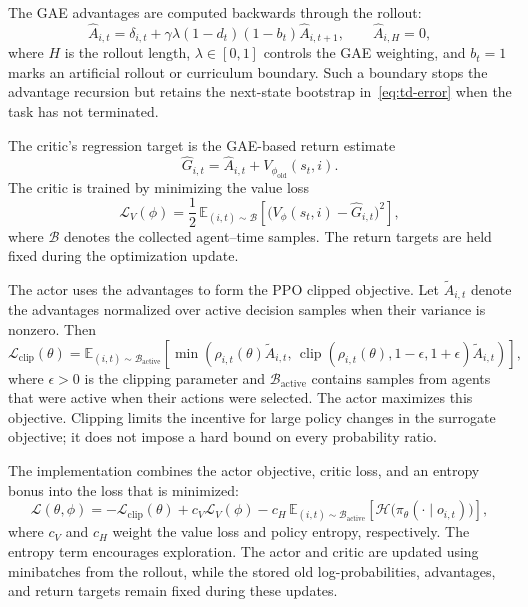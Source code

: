 \documentclass[11pt]{article}
\begin{document}
The GAE advantages are computed backwards through the rollout:
\begin{equation}
    \widehat{A}_{i,t}
    = \delta_{i,t}
      + \gamma\lambda(1-d_t)(1-b_t)\widehat{A}_{i,t+1},
    \qquad \widehat{A}_{i,H}=0,
    \label{eq:gae}
\end{equation}
where $H$ is the rollout length, $\lambda\in[0,1]$ controls the GAE
weighting, and $b_t=1$ marks an artificial rollout or curriculum boundary.
Such a boundary stops the advantage recursion but retains the next-state
bootstrap in~\eqref{eq:td-error} when the task has not terminated.

The critic's regression target is the GAE-based return estimate
\begin{equation}
    \widehat{G}_{i,t}
    = \widehat{A}_{i,t} + V_{\phi_{\mathrm{old}}}(s_t,i).
    \label{eq:value-target}
\end{equation}
The critic is trained by minimizing the value loss
\begin{equation}
    \mathcal{L}_{V}(\phi)
    = \frac{1}{2}\,
      \mathbb{E}_{(i,t)\sim\mathcal{B}}\!\left[
        \bigl(V_\phi(s_t,i)-\widehat{G}_{i,t}\bigr)^2
      \right],
    \label{eq:critic-loss}
\end{equation}
where $\mathcal{B}$ denotes the collected agent--time samples. The return
targets are held fixed during the optimization update.

The actor uses the advantages to form the PPO clipped objective. Let
$\widetilde{A}_{i,t}$ denote the advantages normalized over active decision
samples when their variance is nonzero. Then
\begin{equation}
    \mathcal{L}_{\mathrm{clip}}(\theta)
    = \mathbb{E}_{(i,t)\sim\mathcal{B}_{\mathrm{active}}}\!\left[
        \min\!\left(
          \rho_{i,t}(\theta)\widetilde{A}_{i,t},\,
          \operatorname{clip}\!\left(
            \rho_{i,t}(\theta),1-\epsilon,1+\epsilon
          \right)\widetilde{A}_{i,t}
        \right)
      \right],
    \label{eq:ppo-clipping}
\end{equation}
where $\epsilon>0$ is the clipping parameter and
$\mathcal{B}_{\mathrm{active}}$ contains samples from agents that were
active when their actions were selected. The actor maximizes this objective.
Clipping limits the incentive for large policy changes in the surrogate
objective; it does not impose a hard bound on every probability ratio.

The implementation combines the actor objective, critic loss, and an entropy
bonus into the loss that is minimized:
\begin{equation}
    \mathcal{L}(\theta,\phi)
    = -\mathcal{L}_{\mathrm{clip}}(\theta)
      + c_V\mathcal{L}_{V}(\phi)
      - c_H\,\mathbb{E}_{(i,t)\sim\mathcal{B}_{\mathrm{active}}}\!\left[
          \mathcal{H}\bigl(\pi_\theta(\cdot\mid o_{i,t})\bigr)
        \right],
    \label{eq:combined-loss}
\end{equation}
where $c_V$ and $c_H$ weight the value loss and policy entropy, respectively.
The entropy term encourages exploration. The actor and critic are updated
using minibatches from the rollout, while the stored old log-probabilities,
advantages, and return targets remain fixed during these updates.
\end{document}
